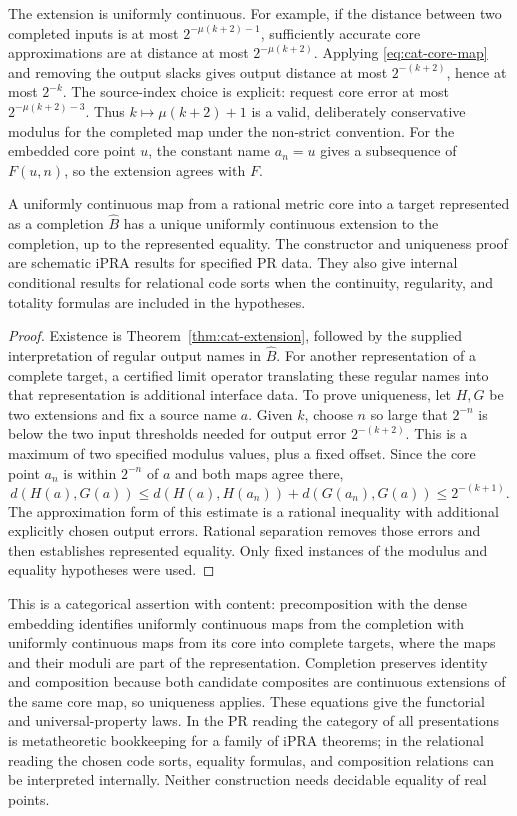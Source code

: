 The extension is uniformly continuous. For example, if the distance between
two completed inputs is at most $2^{-\mu(k+2)-1}$, sufficiently accurate
core approximations are at distance at most $2^{-\mu(k+2)}$.
Applying \eqref{eq:cat-core-map} and removing the output slacks gives
output distance at most $2^{-(k+2)}$, hence at most $2^{-k}$.
The source-index choice is explicit: request core error at most
$2^{-\mu(k+2)-3}$. Thus $k\mapsto\mu(k+2)+1$ is a valid, deliberately
conservative modulus for the completed map under the non-strict convention.
For the embedded core point $u$, the constant name $a_n=u$ gives a subsequence
of $F(u,n)$, so the extension agrees with $F$.

\begin{theorem}
\label{thm:cat-universal}
A uniformly continuous map from a rational metric core into a target
represented as a completion $\widehat B$ has a unique uniformly continuous
extension to the
completion, up to the represented equality. The constructor and uniqueness
proof are schematic iPRA results for specified PR data. They also give
internal conditional results for relational code sorts when the continuity,
regularity, and totality formulas are included in the hypotheses.
\end{theorem}

\begin{proof}
Existence is Theorem~\ref{thm:cat-extension}, followed by the supplied
interpretation of regular output names in $\widehat B$. For another
representation of a complete target, a certified limit operator translating
these regular names into that representation is additional interface data.
To prove
uniqueness, let $H,G$ be two extensions and fix a source name $a$.
Given $k$, choose $n$ so large that $2^{-n}$ is below the two input
thresholds needed for output error $2^{-(k+2)}$. This is a maximum of two
specified modulus values, plus a fixed offset. Since the core point $a_n$
is within $2^{-n}$ of $a$ and both maps agree there,
\[
 d(H(a),G(a))
 \leq d(H(a),H(a_n))+d(G(a_n),G(a))
 \leq 2^{-(k+1)}.
\]
The approximation form of this estimate is a rational inequality with
additional explicitly chosen output errors. Rational separation removes
those errors and then establishes represented equality. Only fixed instances
of the modulus and equality hypotheses were used.
\end{proof}

This is a categorical assertion with content: precomposition with the dense
embedding identifies uniformly continuous maps from the completion with
uniformly continuous maps from its core into complete targets, where the
maps and their moduli are part of the representation. Completion preserves
identity and composition because both candidate composites are continuous
extensions of the same core map, so uniqueness applies. These equations give
the functorial and universal-property laws. In the PR reading the category of
all presentations is metatheoretic bookkeeping for a family of iPRA theorems;
in the relational reading the chosen code sorts, equality formulas, and
composition relations can be interpreted internally. Neither construction
needs decidable equality of real points.

